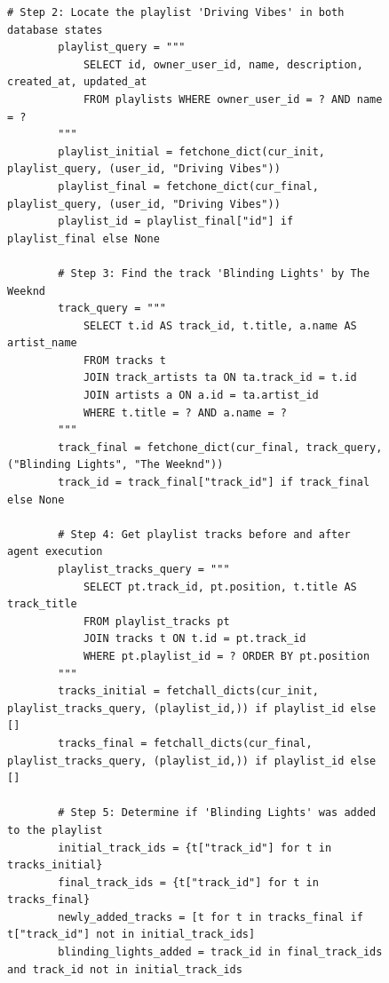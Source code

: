 \begin{figure}[t]
\centering
\begin{minipage}{0.97\textwidth}
\begin{lstlisting}[style=pythonstyle, firstnumber=50]
        # Step 2: Locate the playlist 'Driving Vibes' in both database states
        playlist_query = """
            SELECT id, owner_user_id, name, description, created_at, updated_at
            FROM playlists WHERE owner_user_id = ? AND name = ?
        """
        playlist_initial = fetchone_dict(cur_init, playlist_query, (user_id, "Driving Vibes"))
        playlist_final = fetchone_dict(cur_final, playlist_query, (user_id, "Driving Vibes"))
        playlist_id = playlist_final["id"] if playlist_final else None

        # Step 3: Find the track 'Blinding Lights' by The Weeknd
        track_query = """
            SELECT t.id AS track_id, t.title, a.name AS artist_name
            FROM tracks t
            JOIN track_artists ta ON ta.track_id = t.id
            JOIN artists a ON a.id = ta.artist_id
            WHERE t.title = ? AND a.name = ?
        """
        track_final = fetchone_dict(cur_final, track_query, ("Blinding Lights", "The Weeknd"))
        track_id = track_final["track_id"] if track_final else None

        # Step 4: Get playlist tracks before and after agent execution
        playlist_tracks_query = """
            SELECT pt.track_id, pt.position, t.title AS track_title
            FROM playlist_tracks pt
            JOIN tracks t ON t.id = pt.track_id
            WHERE pt.playlist_id = ? ORDER BY pt.position
        """
        tracks_initial = fetchall_dicts(cur_init, playlist_tracks_query, (playlist_id,)) if playlist_id else []
        tracks_final = fetchall_dicts(cur_final, playlist_tracks_query, (playlist_id,)) if playlist_id else []

        # Step 5: Determine if 'Blinding Lights' was added to the playlist
        initial_track_ids = {t["track_id"] for t in tracks_initial}
        final_track_ids = {t["track_id"] for t in tracks_final}
        newly_added_tracks = [t for t in tracks_final if t["track_id"] not in initial_track_ids]
        blinding_lights_added = track_id in final_track_ids and track_id not in initial_track_ids


\end{lstlisting}
\end{minipage}
\end{figure}
